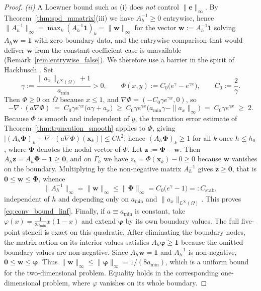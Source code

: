 \documentclass[11pt,a4paper]{article}
\theoremstyle{definition}
\theoremstyle{remark}
\begin{document}
\begin{proof}
\emph{(ii)} A Loewner bound such as (i) does \emph{not} control $\|\bm{e}\|_\infty$. By Theorem~\ref{thm:spd_mmatrix}(iii) we have $A_h^{-1}\ge0$ entrywise, hence $\|A_h^{-1}\|_\infty=\max_k (A_h^{-1}\bm{1})_k=\|\bm{w}\|_\infty$ for the vector $\bm{w}:=A_h^{-1}\bm{1}$ solving $A_h\bm{w}=\bm{1}$ with zero boundary data, and the entrywise comparison that would deliver $\bm{w}$ from the constant-coefficient case is unavailable (Remark~\ref{rem:entrywise_false}). We therefore use a barrier in the spirit of Hackbusch \cite{hackbusch2017}. Set
\[
    \gamma := \frac{\|a_x\|_{L^\infty(\Omega)}+1}{a_{\min}} > 0, \qquad
    \Phi(x,y) := C_0\bigl(e^{\gamma}-e^{\gamma x}\bigr), \qquad C_0 := \frac{2}{\gamma}.
\]
Then $\Phi\ge0$ on $\bar{\Omega}$ because $x\le1$, and $\nabla\Phi=(-C_0\gamma e^{\gamma x},0)$, so
\[
    -\nabla\cdot(a\nabla\Phi) \;=\; C_0\gamma e^{\gamma x}\bigl(a\gamma+a_x\bigr)
    \;\ge\; C_0\gamma e^{\gamma x}\bigl(a_{\min}\gamma-\|a_x\|_\infty\bigr)
    \;=\; C_0\gamma e^{\gamma x} \;\ge\; 2 .
\]
Because $\Phi$ is smooth and independent of $y$, the truncation error estimate of Theorem~\ref{thm:truncation_smooth} applies to $\Phi$, giving $\bigl|(A_h\bm{\Phi})_k+\nabla\cdot(a\nabla\Phi)(\bm{x}_k)\bigr|\le Ch^2$; hence $(A_h\bm{\Phi})_k\ge1$ for all $k$ once $h\le h_0$, where $\bm{\Phi}$ denotes the nodal vector of $\Phi$. Let $\bm{z}:=\bm{\Phi}-\bm{w}$. Then $A_h\bm{z}=A_h\bm{\Phi}-\bm{1}\ge\bm{0}$, and on $\Gamma_h$ we have $z_k=\Phi(\bm{x}_k)-0\ge0$ because $\bm{w}$ vanishes on the boundary. Multiplying by the non-negative matrix $A_h^{-1}$ gives $\bm{z}\ge\bm{0}$, that is $\bm{0}\le\bm{w}\le\bm{\Phi}$, whence
\[
    \|A_h^{-1}\|_\infty = \|\bm{w}\|_\infty \le \|\bm{\Phi}\|_\infty = C_0\bigl(e^{\gamma}-1\bigr) =: C_{\text{stab}},
\]
independent of $h$ and depending only on $a_{\min}$ and $\|a_x\|_{L^\infty(\Omega)}$. This proves \eqref{eq:conv_bound_linf}. Finally, if $a\equiv a_{\min}$ is constant, take $\varphi(x)=\frac{1}{2a_{\min}}x(1-x)$ and extend $\bm{\varphi}$ by its own boundary values. The full five-point stencil is exact on this quadratic. After eliminating the boundary nodes, the matrix action on its interior values satisfies $A_h\bm{\varphi}\ge\bm{1}$ because the omitted boundary values are non-negative. Since $A_h\bm{w}=\bm{1}$ and $A_h^{-1}$ is non-negative, $\bm{0}\le\bm{w}\le\bm{\varphi}$. Thus $\|\bm{w}\|_\infty\le\|\bm{\varphi}\|_\infty=1/(8a_{\min})$, which is a uniform bound for the two-dimensional problem. Equality holds in the corresponding one-dimensional problem, where $\varphi$ vanishes on its whole boundary.
\end{proof}
\end{document}
